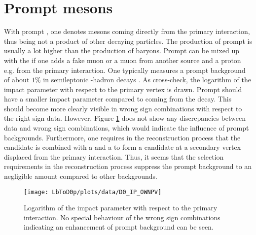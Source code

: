 \section{Prompt \Dz mesons}
With prompt \Dz, one denotes \Dz mesons coming directly from the primary \proton\proton interaction, thus being not a product of other decaying particles.
The production of prompt \Dz is usually a lot higher than the production of \Lb baryons. 
Prompt \Dz can be mixed up with the \LbToDpmunuX if one adds a fake muon or a muon from another source and a proton e.g. from the primary interaction.
One typically measures a prompt \Dz background of about $1\%$ in semileptonic \bquark-hadron decays \cite{asld_LHCb}.
As cross-check, the logarithm of the \Dz impact parameter with respect to the primary vertex is drawn.
Prompt \Dz should have a smaller impact parameter compared to \Dz coming from the \Lb decay.
This should become more clearly visible in wrong sign combinations with respect to the right sign data.
However, Figure \ref{fig:plot_D0_IP} does not show any discrepancies between data and wrong sign combinations, which would indicate the influence of prompt \Dz backgrounds.
Furthermore, one requires in the reconstruction process that the \Dz candidate is combined with a \mun and a \proton to form a \Lb candidate at a secondary vertex displaced from the primary interaction.
Thus, it seems that the selection requirements in the reconstruction process suppress the prompt \Dz background to an negligible amount compared to other backgrounds. 
\begin{figure}[tb]
	\centering
	\texttt{[image: LbToD0p/plots/data/D0\_IP\_OWNPV]}
	\caption{Logarithm of the \Dz impact parameter with respect to the primary \proton\proton interaction. No special behaviour of the wrong sign combinations indicating an enhancement of prompt \Dz background can be seen.}
	\label{fig:plot_D0_IP}
\end{figure}

